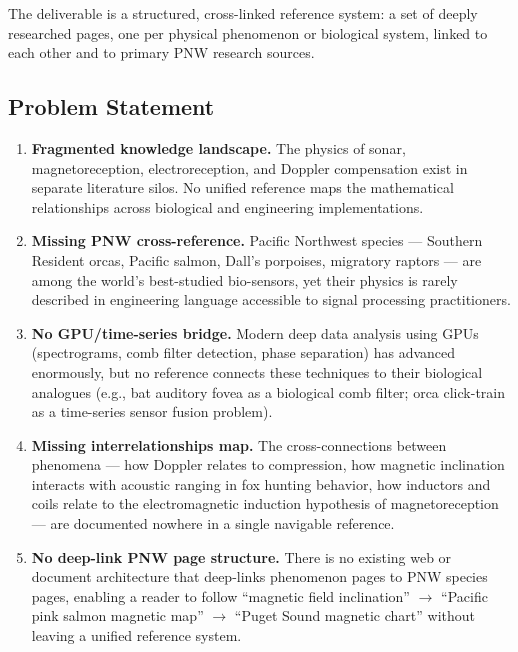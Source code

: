 \documentclass[11pt,letterpaper]{article}
\begin{document}
The deliverable is a structured, cross-linked reference system: a set of deeply researched pages, one per physical phenomenon or biological system, linked to each other and to primary PNW research sources.

\subsection{Problem Statement}

\begin{enumerate}
  \item \textbf{Fragmented knowledge landscape.} The physics of sonar, magnetoreception, electroreception, and Doppler compensation exist in separate literature silos. No unified reference maps the mathematical relationships across biological and engineering implementations.
  
  \item \textbf{Missing PNW cross-reference.} Pacific Northwest species --- Southern Resident orcas, Pacific salmon, Dall's porpoises, migratory raptors --- are among the world's best-studied bio-sensors, yet their physics is rarely described in engineering language accessible to signal processing practitioners.
  
  \item \textbf{No GPU/time-series bridge.} Modern deep data analysis using GPUs (spectrograms, comb filter detection, phase separation) has advanced enormously, but no reference connects these techniques to their biological analogues (e.g., bat auditory fovea as a biological comb filter; orca click-train as a time-series sensor fusion problem).
  
  \item \textbf{Missing interrelationships map.} The cross-connections between phenomena --- how Doppler relates to compression, how magnetic inclination interacts with acoustic ranging in fox hunting behavior, how inductors and coils relate to the electromagnetic induction hypothesis of magnetoreception --- are documented nowhere in a single navigable reference.
  
  \item \textbf{No deep-link PNW page structure.} There is no existing web or document architecture that deep-links phenomenon pages to PNW species pages, enabling a reader to follow ``magnetic field inclination'' $\to$ ``Pacific pink salmon magnetic map'' $\to$ ``Puget Sound magnetic chart'' without leaving a unified reference system.
\end{enumerate}
\end{document}
